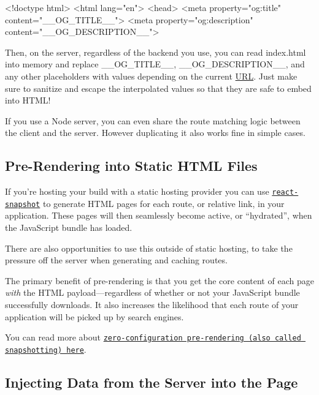 \begin{DoxyCode}
<!doctype html>
<html lang="en">
  <head>
    <meta property="og:title" content="\_\_OG\_TITLE\_\_">
    <meta property="og:description" content="\_\_OG\_DESCRIPTION\_\_">
\end{DoxyCode}


Then, on the server, regardless of the backend you use, you can read {\ttfamily index.\+html} into memory and replace {\ttfamily \+\_\+\+\_\+\+O\+G\+\_\+\+T\+I\+T\+L\+E\+\_\+\+\_\+}, {\ttfamily \+\_\+\+\_\+\+O\+G\+\_\+\+D\+E\+S\+C\+R\+I\+P\+T\+I\+O\+N\+\_\+\+\_\+}, and any other placeholders with values depending on the current \mbox{\hyperlink{namespace_u_r_l}{U\+RL}}. Just make sure to sanitize and escape the interpolated values so that they are safe to embed into H\+T\+M\+L!

If you use a Node server, you can even share the route matching logic between the client and the server. However duplicating it also works fine in simple cases.

\subsection*{Pre-\/\+Rendering into Static H\+T\+ML Files}

If you’re hosting your {\ttfamily build} with a static hosting provider you can use \href{https://www.npmjs.com/package/react-snapshot}{\tt react-\/snapshot} to generate H\+T\+ML pages for each route, or relative link, in your application. These pages will then seamlessly become active, or “hydrated”, when the Java\+Script bundle has loaded.

There are also opportunities to use this outside of static hosting, to take the pressure off the server when generating and caching routes.

The primary benefit of pre-\/rendering is that you get the core content of each page {\itshape with} the H\+T\+ML payload—regardless of whether or not your Java\+Script bundle successfully downloads. It also increases the likelihood that each route of your application will be picked up by search engines.

You can read more about \href{https://medium.com/superhighfives/an-almost-static-stack-6df0a2791319}{\tt zero-\/configuration pre-\/rendering (also called snapshotting) here}.

\subsection*{Injecting Data from the Server into the Page}

